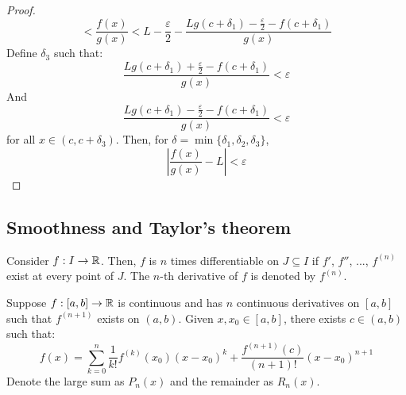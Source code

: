 \begin{proof}
\begin{equation*}
        <
        \frac{f(x)}{g(x)}
        <
        L - \frac{\varepsilon}{2} - \frac{Lg(c+\delta_1) - \frac{\varepsilon}{2} - f(c+\delta_1)}{g(x)}
    \end{equation*}
    Define $\delta_3$ such that:
    \begin{equation*}
        \frac{Lg(c+\delta_1) + \frac{\varepsilon}{2} - f(c+\delta_1)}{g(x)} < \varepsilon
    \end{equation*}
    And
    \begin{equation*}
        \frac{Lg(c+\delta_1) - \frac{\varepsilon}{2} - f(c+\delta_1)}{g(x)} < \varepsilon
    \end{equation*}
    for all $x \in (c, c+ \delta_3)$. Then, for $\delta = \min \{ \delta_1, \delta_2, \delta_3 \}$,
    \begin{equation*}
        \left |
            \frac{f(x)}{g(x)} - L
        \right | < \varepsilon
    \end{equation*}
\end{proof}

\subsection{Smoothness and Taylor's theorem}

\begin{definition}
    Consider $f: I \to \mathbb{R}$. Then, $f$ is $n$ times differentiable on $J \subseteq I$ if $f'$, $f''$, ..., $f^{(n)}$ exist at every point of $J$. The $n$-th derivative of $f$ is denoted by $f^{(n)}$.
\end{definition}

\begin{theorem}
    Suppose $f: [a,b] \to \mathbb{R}$ is continuous and has $n$ continuous derivatives on $[a,b]$ such that $f^{(n+1)}$ exists on $(a,b)$. Given $x, x_0 \in [a,b]$, there exists $c \in (a,b)$ such that:
    \begin{equation}
        f(x) = \sum \limits_{k = 0}^n \frac{1}{k!}f^{(k)}(x_0)(x-x_0)^k + \frac{f^{(n+1)}(c)}{(n+1)!}(x-x_0)^{n+1}
    \end{equation}
    Denote the large sum as $P_n(x)$ and the remainder as $R_n(x)$.
\end{theorem}

